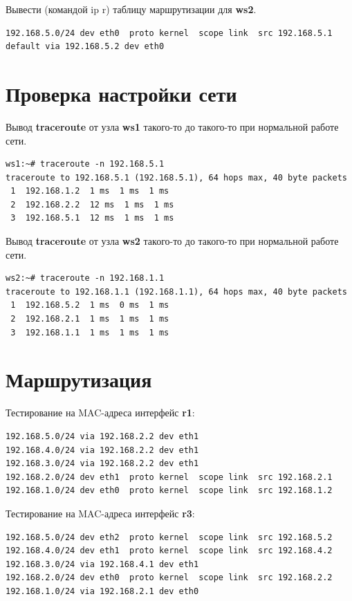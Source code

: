 \documentclass[a4paper,12pt]{article}
\begin{document}
Вывести (командой ip r) таблицу маршрутизации для \textbf{ws2}.

\begin{Verbatim}
192.168.5.0/24 dev eth0  proto kernel  scope link  src 192.168.5.1 
default via 192.168.5.2 dev eth0
\end{Verbatim}


\section{Проверка настройки сети}

Вывод \textbf{traceroute} от узла \textbf{ws1} такого-то до такого-то при нормальной работе сети.

\begin{Verbatim}
ws1:~# traceroute -n 192.168.5.1
traceroute to 192.168.5.1 (192.168.5.1), 64 hops max, 40 byte packets
 1  192.168.1.2  1 ms  1 ms  1 ms
 2  192.168.2.2  12 ms  1 ms  1 ms
 3  192.168.5.1  12 ms  1 ms  1 ms
\end{Verbatim}

Вывод \textbf{traceroute} от узла \textbf{ws2} такого-то до такого-то при нормальной работе сети.

\begin{Verbatim}
ws2:~# traceroute -n 192.168.1.1
traceroute to 192.168.1.1 (192.168.1.1), 64 hops max, 40 byte packets
 1  192.168.5.2  1 ms  0 ms  1 ms
 2  192.168.2.1  1 ms  1 ms  1 ms
 3  192.168.1.1  1 ms  1 ms  1 ms
\end{Verbatim}


\section{Маршрутизация}


Тестирование на MAC-адреса интерфейс \textbf{r1}:

\begin{Verbatim}
192.168.5.0/24 via 192.168.2.2 dev eth1 
192.168.4.0/24 via 192.168.2.2 dev eth1 
192.168.3.0/24 via 192.168.2.2 dev eth1 
192.168.2.0/24 dev eth1  proto kernel  scope link  src 192.168.2.1 
192.168.1.0/24 dev eth0  proto kernel  scope link  src 192.168.1.2 
\end{Verbatim}

Тестирование на MAC-адреса интерфейс \textbf{r3}:

\begin{Verbatim}
192.168.5.0/24 dev eth2  proto kernel  scope link  src 192.168.5.2 
192.168.4.0/24 dev eth1  proto kernel  scope link  src 192.168.4.2 
192.168.3.0/24 via 192.168.4.1 dev eth1 
192.168.2.0/24 dev eth0  proto kernel  scope link  src 192.168.2.2 
192.168.1.0/24 via 192.168.2.1 dev eth0 
\end{Verbatim}
\end{document}
